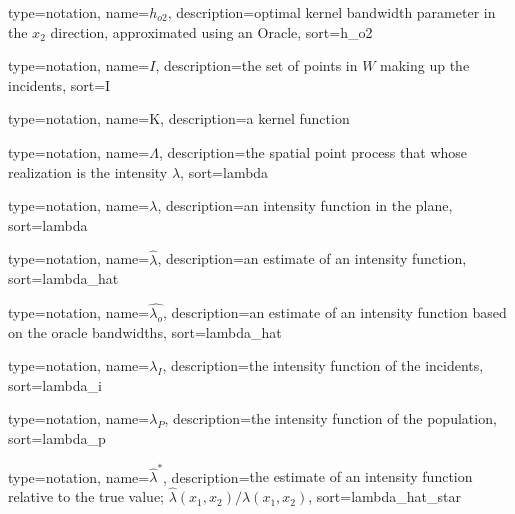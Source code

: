 {%
   type=notation,
   name={\ensuremath{h_{o2}}},
   description={optimal kernel bandwidth parameter in the \ensuremath{x_2} direction, approximated using an Oracle},
   sort={h_o2}
}

{%
   type=notation,
   name={\ensuremath{I}},
   description={the set of points in \ensuremath{W} making up the incidents},
   sort={I}
}

{%
   type=notation,
   name={K},
   description={a kernel function}
}

{%
   type=notation,
   name={\ensuremath{\Lambda}},
   description={the spatial point process that whose realization is the intensity \ensuremath{\lambda}},
   sort={lambda}
}

{%
   type=notation,
   name={\ensuremath{\lambda}},
   description={an intensity function in the plane},
   sort={lambda}
}

{%
   type=notation,
   name={\ensuremath{\hat{\lambda}}},
   description={an estimate of an intensity function},
   sort={lambda_hat}
}

{%
   type=notation,
   name={\ensuremath{\hat{\lambda_o}}},
   description={an estimate of an intensity function based on the oracle bandwidths},
   sort={lambda_hat}
}

{%
   type=notation,
   name={\ensuremath{\lambda_I}},
   description={the intensity function of the incidents},
   sort={lambda_i}
}

{%
   type=notation,
   name={\ensuremath{\lambda_P}},
   description={the intensity function of the population},
   sort={lambda_p}
}

{%
   type=notation,
   name={\ensuremath{\hat{\lambda}^*}},
   description={the estimate of an intensity function relative to the true value; \ensuremath{\hat{\lambda}(x_1, x_2)/\lambda(x_1, x_2)}},
   sort={lambda_hat_star}
}

